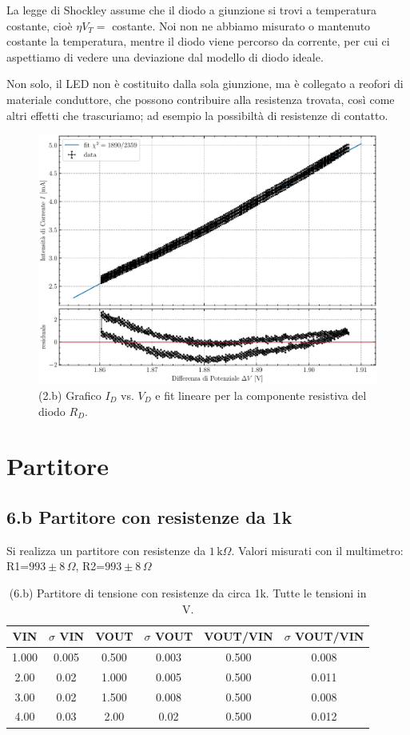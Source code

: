 \documentclass[10pt, a4paper, italian]{article}
\begin{document}
La legge di Shockley assume che il diodo a giunzione si trovi a temperatura
costante, cioè $\eta V_T =$ costante. Noi non ne abbiamo misurato o
mantenuto costante la temperatura, mentre il diodo viene percorso da corrente,
per cui ci aspettiamo di vedere una deviazione dal modello di diodo ideale.

Non solo, il LED non è costituito dalla sola giunzione, ma è collegato a
reofori di materiale conduttore, che possono contribuire alla resistenza
trovata, così come altri effetti che trascuriamo; ad esempio la possibiltà di resistenze di contatto.

\begin{figure}[htb]
\centering
\includegraphics[scale=0.7]{ivlinfit}
\caption{(2.b) Grafico $I_{D}$ vs. $V_{D}$ e fit lineare per la componente
resistiva del diodo $R_D$.}
\end{figure}

\section{Partitore}

\subsection*{6.b Partitore con resistenze da 1k}

Si realizza un partitore con resistenze da $1 \,\mathrm{k}\Omega$.
Valori misurati con il multimetro: R1=$993 \pm 8 \,\Omega$,
R2=$993 \pm 8 \,\Omega$


\begin{table}[h]
\centering
\begin{tabular}{|c|c|c|c|c|c|}
\hline 
VIN& $\sigma$ VIN  & VOUT	 & $\sigma$ VOUT & VOUT/VIN & $\sigma$ VOUT/VIN \\
\hline 
1.000 & 0.005 & 0.500 & 0.003 & 0.500 & 0.008 \\
2.00 & 0.02 & 1.000 & 0.005 & 0.500 & 0.011 \\
3.00 & 0.02 & 1.500 & 0.008 & 0.500 &0.008 \\
4.00 & 0.03 & 2.00 & 0.02 & 0.500 & 0.012 \\
\hline 
\end{tabular} 
\caption{(6.b) Partitore di tensione con resistenze da circa 1k. Tutte le
tensioni in V.\label{tab:div1k}}
\end{table}
\end{document}
